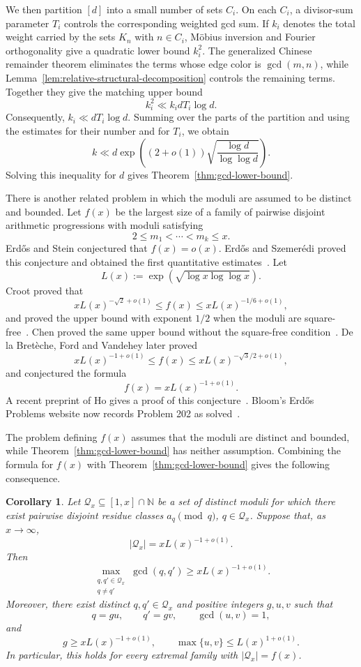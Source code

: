 \documentclass[11pt]{amsart}
\newtheorem{cor}[thm]{Corollary}
\theoremstyle{remark}
\begin{document}
We then partition $[d]$ into a small number of sets $C_i$.  On each $C_i$, a
divisor-sum parameter $T_i$ controls the corresponding weighted gcd sum.  If $k_i$
denotes the total weight carried by the sets $K_n$ with $n\in C_i$, M\"obius
inversion and Fourier orthogonality give a quadratic lower bound $k_i^2$.
The generalized Chinese remainder theorem eliminates the terms whose edge
color is $\gcd(m,n)$, while
Lemma~\ref{lem:relative-structural-decomposition} controls the remaining
terms.  Together they give the matching upper bound
\[
  k_i^2\ll k_i dT_i\log d.
\]
Consequently, $k_i\ll dT_i\log d$.  Summing over the parts of the partition
and using the estimates for their number and for $T_i$, we obtain
\[
  k\ll d\exp\!\left((2+o(1))
    \sqrt{\frac{\log d}{\log\log d}}\right).
\]
Solving this inequality for $d$ gives Theorem~\ref{thm:gcd-lower-bound}.

There is another related problem in which the moduli are assumed to be
distinct and bounded.  Let $f(x)$ be the largest size of a family of pairwise
disjoint arithmetic progressions with moduli satisfying
\[
  2\leq m_1<\cdots<m_k\leq x.
\]
Erd\H{o}s and Stein conjectured that $f(x)=o(x)$.  Erd\H{o}s and
Szemer\'edi proved this conjecture and obtained the first quantitative
estimates~\cite{erdos-szemeredi1968}.  Let
\[
  L(x):=\exp\!\left(\sqrt{\log x\log\log x}\right).
\]
Croot proved that
\[
  xL(x)^{-\sqrt2+o(1)}\leq f(x)
  \leq xL(x)^{-1/6+o(1)},
\]
and proved the upper bound with exponent $1/2$ when the moduli are
square-free~\cite{croot2003}.  Chen proved the same upper bound without the
square-free condition~\cite{chen2005}.  De la Bret\`eche, Ford and Vandehey
later proved
\begin{equation}
  xL(x)^{-1+o(1)}\leq f(x)
  \leq xL(x)^{-\sqrt3/2+o(1)},
\end{equation}
and conjectured the formula~\cite{bdfv2013}
\[
  f(x)=xL(x)^{-1+o(1)}.
\]
A recent preprint of Ho gives a proof of this conjecture~\cite{ho2026}.
Bloom's Erd\H{o}s Problems website now records Problem 202 as
solved~\cite{bloom-erdos202}.

The problem defining $f(x)$ assumes that the moduli are distinct and bounded,
while Theorem~\ref{thm:gcd-lower-bound} has neither assumption.  Combining
the formula for $f(x)$ with Theorem~\ref{thm:gcd-lower-bound} gives the
following consequence.

\begin{cor}
  Let $\mathcal Q_x\subseteq[1,x]\cap\mathbb N$ be a set of distinct moduli
  for which there exist pairwise disjoint residue classes
  $a_q\pmod q$, $q\in\mathcal Q_x$.  Suppose that, as $x\to\infty$,
  \[
    |\mathcal Q_x|=xL(x)^{-1+o(1)}.
  \]
  Then
  \[
    \max_{\substack{q,q'\in\mathcal Q_x\\q\neq q'}}\gcd(q,q')
    \geq xL(x)^{-1+o(1)}.
  \]
  Moreover, there exist distinct $q,q'\in\mathcal Q_x$ and positive integers
  $g,u,v$ such that
  \[
    q=gu,\qquad q'=gv,\qquad \gcd(u,v)=1,
  \]
  and
  \[
    g\geq xL(x)^{-1+o(1)},
    \qquad \max\{u,v\}\leq L(x)^{1+o(1)}.
  \]
  In particular, this holds for every extremal family with
  $|\mathcal Q_x|=f(x)$.
\end{cor}
\end{document}
